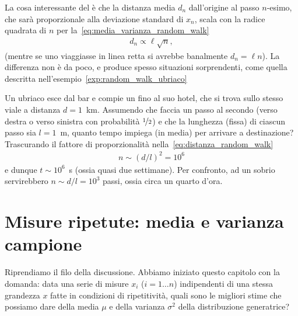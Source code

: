 
La cosa interessante del  è che la distanza media $d_n$
dall'origine al passo $n$-esimo, che sarà proporzionale alla deviazione
standard di $x_n$, scala con la radice quadrata di $n$ per
la~\eqref{eq:media_varianza_random_walk}
\begin{align}\label{eq:distanza_random_walk}
  d_n \propto \ell\sqrt{n},
\end{align}
(mentre se uno viaggiasse in linea retta si avrebbe banalmente $d_n = \ell n$).
La differenza non è da poco, e produce spesso situazioni sorprendenti, come
quella descritta nell'esempio~\ref{exp:random_walk_ubriaco}

\begin{examplebox}
  \begin{example}\label{exp:random_walk_ubriaco}
    Un ubriaco esce dal bar e compie un  fino al suo hotel,
    che si trova sullo stesso viale a distanza $d = 1$~km. Assumendo che faccia
    un passo al secondo (verso destra o verso sinistra con probabilità
    $\nicefrac{1}{2}$) e che la lunghezza (fissa) di ciascun
    passo  sia $l = 1$~m, quanto tempo impiega (in media) per arrivare a
    destinazione? Trascurando il fattore di proporzionalità
    nella~\eqref{eq:distanza_random_walk}
    \begin{align*}
      n \sim (d/l)^2 = 10^6
    \end{align*}
    e dunque $t \sim 10^6$~s (ossia quasi due settimane). Per confronto, ad un
    sobrio servirebbero $n \sim d/l = 10^3$ passi, ossia circa un quarto
    d'ora.
  \end{example}
\end{examplebox}


\section{Misure ripetute: media e varianza campione}
\label{sec:media_varianza_campione}

Riprendiamo il filo della discussione. Abbiamo iniziato questo capitolo con la
domanda: data una serie di misure $x_i$ ($i = 1\ldots n$) indipendenti di una
stessa grandezza $x$ fatte in condizioni di ripetitività, quali sono le
migliori stime che possiamo dare della media $\mu$ e della varianza $\sigma^2$
della distribuzione generatrice?

